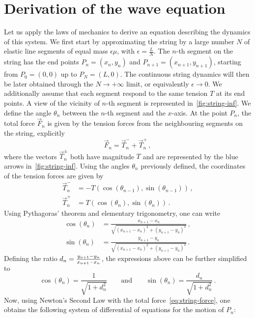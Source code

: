\section{Derivation of the wave equation}
Let us apply the laws of mechanics to derive an equation describing the dynamics of this
system. We first start by approximating the string by a large number $N$ of elastic line
segments of equal mass $\epsilon\mu$, with $\epsilon=\frac{L}{N}$. The $n$-th segment on
the string has the end points $P_n=(x_n,y_n)$ and $P_{n+1}=(x_{n+1},y_{n+1})$, starting
from $P_0=(0,0)$ up to $P_N=(L,0)$. The continuous string dynamics will then be later
obtained through the $N\to+\infty$ limit, or equivalently $\epsilon\to 0$. We additionally
assume that each segment respond to the same tension $T$ at its end points. A view of the
vicinity of $n$-th segment is represented in~\cref{fig:string-inf}. We define the angle
$\theta_n$ between the $n$-th segment and the $x$-axis. At the point $P_n$, the total
force $\vec{F}_n$ is given by the tension forces from the neighbouring segments on the
string, explicitly
\begin{equation}
  \vec{F}_n=\vec{T}_n^-+\vec{T}_n^+\,,\label{eq:string-force}
\end{equation}
where the vectors $\vec{T}_n^\pm$ both have magnitude $T$ and are represented by the
blue arrows in~\cref{fig:string-inf}. Using the angles $\theta_n$ previously defined, the
coordinates of the tension forces are given by
\begin{align}
  \vec{T}_n^-&=-T(\cos(\theta_{n-1}),\sin(\theta_{n-1}))\,,\\
  \vec{T}_n^+&=T(\cos(\theta_{n}),\sin(\theta_{n}))\,.
\end{align}
Using Pythagoras' theorem and elementary trigonometry, one can write
\begin{align}
  \cos(\theta_n)&=\frac{x_{n+1}-x_n}{\sqrt{(x_{n+1}-x_n)^2+(y_{n+1}-y_n)^2}}\,,\\
  \sin(\theta_n)&=\frac{y_{n+1}-y_n}{\sqrt{(x_{n+1}-x_n)^2+(y_{n+1}-y_n)^2}}\,.
\end{align}
Defining the ratio $d_n=\smash{\frac{y_{n+1}-y_n}{x_{n+1}-x_n}}$, the expressions above
can be further simplified to
\begin{equation}
  \cos(\theta_n)=\frac{1}{\sqrt{1+d_n^2}}\qquad\text{and}\qquad
  \sin(\theta_n)=\frac{d_n}{\sqrt{1+d_n^2}}\,.
\end{equation}
Now, using Newton's Second Law with the total force~\cref{eq:string-force}, one obtains
the following system of differential of equations for the motion of $P_n$:
